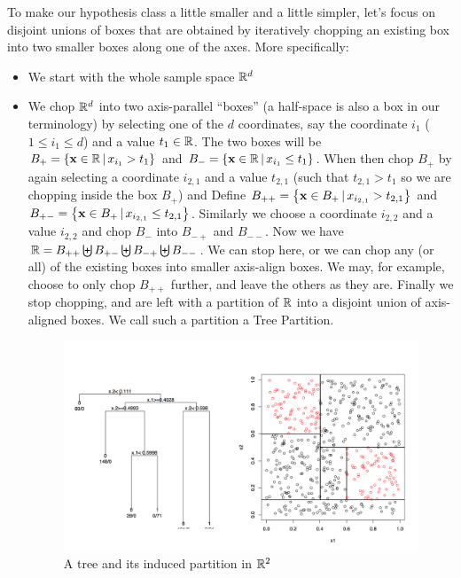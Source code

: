  To make our hypothesis class a little smaller and a little simpler, let's focus
 on  disjoint unions of boxes that are obtained by iteratively chopping an
 existing box into two smaller boxes along one of the axes. More specifically:
 \begin{itemize}
   \item We start with the whole sample space $\mathbb{R}^d$
   \item We chop $\mathbb{R}^d$ into two axis-parallel ``boxes'' (a half-space is
     also a box in our terminology) by selecting one of the $d$ coordinates, say
     the coordinate $i_1$
     ($1\leq i_1 \leq d$) and a value $t_1\in\mathbb{R}$. The two boxes will
     be $B_+=\left\{ \mathbf{x}\in\mathbb{R}\,|\, x_{i_1}>t_1 \right\}$ and 
     $B_-=\left\{ \mathbf{x}\in\mathbb{R}\,|\, x_{i_1}\leq t_1 \right\}$.
     When then chop $B_+$ by again selecting a coordinate $i_{2,1}$ and a value
     $t_{2,1}$ (such that $t_{2,1}>t_1$ so we are chopping inside the box $B_+$)
     and Define $B_{++} = \left\{ \mathbf{x}\in B_+\,|\, x_{i_{2,1}}>t_{2,1} \right\}$
     and  $B_{+-} = \left\{ \mathbf{x}\in B_+\,|\, x_{i_{2,1}}\leq t_{2,1}
     \right\}$.
     Similarly we choose a coordinate $i_{2,2}$ and a value $i_{2,2}$ and chop
     $B_-$ into  $B_{-+}$ and  $B_{--}$. Now we have $\mathbb{R} = B_{++} \biguplus
     B_{+-} \biguplus
     B_{-+} \biguplus
     B_{--} $. We can stop here, or we can chop any (or all) of the existing
     boxes into smaller axis-align boxes. We may, for example, choose to only
     chop $B_{++}$   further, and leave the others as they are. 
     Finally we stop chopping, and are left with a partition of $\mathbb{R}$ into a
     disjoint union of axis-aligned boxes. We call such a partition a Tree
     Partition. 
     
     \begin{figure}[h!]
       \centering
       \includegraphics[width=5in]{tree2.png}
       \caption{A tree and its induced partition in $\mathbb{R}^2$}
     \end{figure}
     

\end{itemize}
